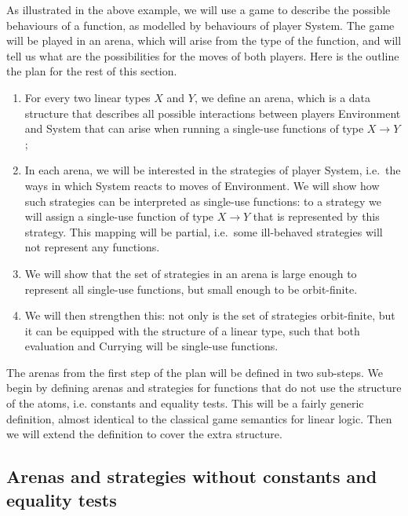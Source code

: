 \documentclass[10pt,a4paper]{amsart}
\numberwithin{equation}{section}
\theoremstyle{plain}
\begin{document}
As illustrated in the above example, we will use a game to describe the possible behaviours of a function, as modelled by behaviours of player System. The game will be played in an arena, which will arise from the type of the function, and will tell us what are the possibilities for the moves of both players.  Here is the  outline the plan for the rest of this section. 
\begin{enumerate}
    \item For every two linear types $X$ and $Y$, we  define an arena, which is a data structure that describes all possible interactions between players Environment and System that can arise when running a  single-use  functions of type $X \to Y$;
    \item In each arena, we will be interested in the strategies of player System, i.e.~the ways in which System reacts to moves of Environment. We will show how such strategies can be interpreted as single-use functions: to a strategy we will assign a single-use function of type $X \to Y$ that is represented by this strategy. This mapping will be partial, i.e.~some ill-behaved strategies will not represent any functions. 
    \item We will show that the  set of strategies in an arena is  large enough to represent all single-use functions, but small enough to be orbit-finite. 
    \item We will then strengthen this: not only is the set of strategies orbit-finite, but it can be equipped with the structure of a linear type, such that both evaluation and Currying will be single-use functions.
\end{enumerate}

The arenas from the first step of the plan will  be defined in two sub-steps. We begin by defining arenas and strategies for functions that do not use the structure of the atoms, i.e. constants and equality tests. This will be a fairly generic definition, almost identical to the classical game semantics for linear logic. Then we will extend the definition to cover the extra structure. 

\subsection{Arenas and strategies without constants and equality tests}
\label{sec:arenas-without-constants-and-equality-tests}
\end{document}
